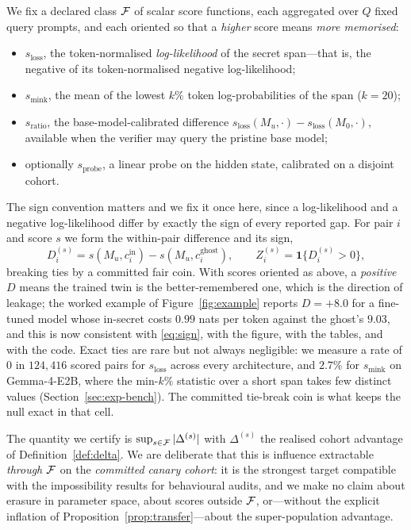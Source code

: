 We fix a declared class $\mathcal{F}$ of scalar score functions, each aggregated over $Q$ fixed
query prompts, and each oriented so that a \emph{higher} score means \emph{more
memorised}:
\begin{itemize}
\item $s_{\mathrm{loss}}$, the token-normalised \emph{log-likelihood} of the secret
      span---that is, the negative of its token-normalised negative log-likelihood;
\item $s_{\mathrm{mink}}$, the mean of the lowest $k\%$ token log-probabilities of the
      span ($k = 20$);
\item $s_{\mathrm{ratio}}$, the base-model-calibrated difference
      $s_{\mathrm{loss}}(M_u,\cdot) - s_{\mathrm{loss}}(M_0,\cdot)$, available when the
      verifier may query the pristine base model;
\item optionally $s_{\mathrm{probe}}$, a linear probe on the hidden state, calibrated
      on a disjoint cohort.
\end{itemize}
The sign convention matters and we fix it once here, since a log-likelihood and a
negative log-likelihood differ by exactly the sign of every reported gap. For pair $i$ and
score $s$ we form the within-pair difference and its sign,
\begin{equation}\label{eq:sign}
D_i^{(s)} = s(M_u, c_i^{\text{in}}) - s(M_u, c_i^{\text{ghost}}), \qquad
Z_i^{(s)} = \mathbf{1}\{D_i^{(s)} > 0\},
\end{equation}
breaking ties by a committed fair coin. With scores oriented as above, a
\emph{positive} $D$ means the trained twin is the better-remembered one, which is the
direction of leakage; the worked example of Figure~\ref{fig:example} reports
$D = +8.0$ for a fine-tuned model whose in-secret costs $0.99$ nats per token against
the ghost's $9.03$, and this is now consistent with \eqref{eq:sign}, with the figure,
with the tables, and with the code. Exact ties are rare but not always negligible: we
measure a rate of $0$ in $124{,}416$ scored pairs for $s_{\mathrm{loss}}$ across every
architecture, and $2.7\%$ for $s_{\mathrm{mink}}$ on Gemma-4-E2B, where the min-$k\%$
statistic over a short span takes few distinct values
(Section~\ref{sec:exp-bench}). The committed tie-break coin is what keeps the null
exact in that cell.

The quantity we certify is $\sup_{s\in\mathcal{F}}|\Delta^{(s)}|$ with $\Delta^{(s)}$ the
realised cohort advantage of Definition~\ref{def:delta}. We are deliberate that this
is influence extractable \emph{through $\mathcal{F}$} on the \emph{committed canary cohort}: it
is the strongest target compatible with the impossibility results for behavioural
audits, and we make no claim about erasure in parameter space, about scores outside
$\mathcal{F}$, or---without the explicit inflation of Proposition~\ref{prop:transfer}---about
the super-population advantage.


